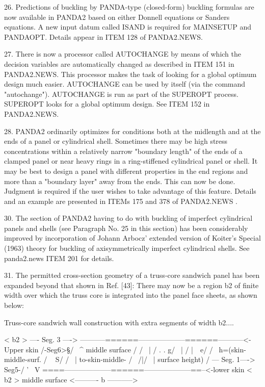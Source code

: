 26. Predictions of buckling by PANDA-type (closed-form) buckling formulas
are now available in PANDA2 based on either Donnell equations or Sanders
equations.  A new input datum called ISAND is required for MAINSETUP and
PANDAOPT.  Details appear in ITEM 128 of PANDA2.NEWS. 

27. There is now a processor called AUTOCHANGE by means of which the
decision variables are automatically changed as described in ITEM 151 in
PANDA2.NEWS. This processor makes the task of looking for a global optimum
design much easier. AUTOCHANGE can be used by itself (via the command
"autochange"). AUTOCHANGE is run as part of the SUPEROPT process. SUPEROPT
looks for a global optimum design. See ITEM 152 in PANDA2.NEWS. 

28. PANDA2 ordinarily optimizes for conditions both at the midlength and
at the ends of a panel or cylindrical shell. Sometimes there may be high
stress concentrations within a relatively narrow "boundary length" of the
ends of a clamped panel or near heavy rings in a ring-stiffened
cylindrical panel or shell. It may be best to design a panel with
different properties in the end regions and more than a "boundary layer"
away from the ends. This can now be done. Judgment is required if the user
wishes to take advantage of this feature. Details and an example are
presented in ITEMs 175 and 378 of PANDA2.NEWS .

30. The section of PANDA2 having to do with buckling of imperfect
cylindrical panels and shells (see Paragraph No. 25 in this section) has
been considerably improved by incorporation of Johann Arbocz' extended
version of Koiter's Special (1963) theory for buckling of axisymmetrically
imperfect cylindrical shells. See panda2.news ITEM 201 for details. 

31. The permitted cross-section geometry of a truss-core sandwich panel
has been expanded beyond that shown in Ref. [43]: There may now be a
region b2 of finite width over which the truss core is integrated into
the panel face sheets, as shown below:

      Truss-core sandwich wall construction
       with extra segments of width b2....

                 < b2 >  ---- Seg. 3 ---->
      -----------======--------------------======-----------<-Upper skin
                /-Seg6>\S                 /      \        ^    middle surface
               /        /        \       |
              /        . \g.           g/          \      |
             /         |\ \           e/ /          \     h=(skin-middle-surf.
            /            \ \2        S/ /            \    |   to-skin-middle-
           /                \        /|/              \   |   surface height)
          /  --- Seg. 1----> \<Seg5-/ '                \  V
      ====--------------------======--------------------==--<-lower skin
                              < b2 >                         middle surface
          <---------- b ----------->

